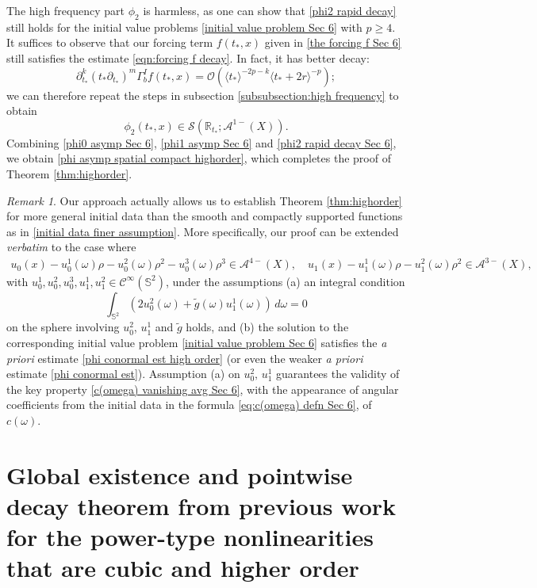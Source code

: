 \documentclass[10pt,a4paper,reqno]{amsart}
\newcommand{\CI}{\mathcal{C}^\infty}
\newcommand{\A}{\mathcal{A}}
\newcommand{\pa}{\partial}
\newcommand{\la}{\langle}
\newcommand{\ra}{\rangle}
\renewcommand{\S}{{\mathbb S}}
\theoremstyle{definition}
\theoremstyle{remark}
\newtheorem{remark}[theorem]{Remark}
\numberwithin{equation}{section}
\newcommand{\ts}{t_*}
\begin{document}
The high frequency part $\phi_2$ is harmless, as one can show that \eqref{phi2 rapid decay} still holds for the initial value problems \eqref{initial value problem Sec 6} with $p\geq 4$. It suffices to observe that our forcing term $f(\ts,x)$ given in \eqref{the forcing f Sec 6} still satisfies the estimate \eqref{eqn:forcing f decay}. In fact, it has better decay:
\[
    \pa_{t_*}^k(\ts\pa_{t_*})^m \Gamma_b^I f(\ts,x) = \mathcal{O}(\la t_*\ra^{-2p-k} \la t_*+2r\ra^{-p});
\]
we can therefore repeat the steps in subsection \ref{subsubsection:high frequency} to obtain 
\begin{equation}
\label{phi2 rapid decay Sec 6}
    \phi_2(t_*,x) \in \mathscr{S}(\mathbb{R}_{t_*};\A^{1-}(X)).
\end{equation}
Combining \eqref{phi0 asymp Sec 6}, \eqref{phi1 asymp Sec 6} and \eqref{phi2 rapid decay Sec 6}, we obtain \eqref{phi asymp spatial compact highorder}, which completes the proof of Theorem \ref{thm:highorder}.

\begin{remark}
\label{rmk:p=4 or larger}
Our approach actually allows us to establish Theorem \ref{thm:highorder} for more general initial data than the smooth and compactly supported functions as in \eqref{initial data finer assumption}. More specifically, our proof can be extended \textit{verbatim} to the case where 
\[
    \begin{gathered}
        u_0(x) - u_{0}^1(\omega)\rho - u_{0}^2(\omega)\rho^2 - u_{0}^3(\omega)\rho^3 \in \A^{4-}(X),
        \quad
        u_1(x) - u_{1}^1(\omega)\rho - u_{1}^2(\omega)\rho^2 \in \A^{3-}(X),
    \end{gathered}
\]
with $u_0^1, u_0^2, u_0^3, u_1^1, u_1^2 \in\CI(\S^2)$, under the assumptions (a) an integral condition $$   
\int_{\S^2} (2u_0^2(\omega)+\tilde{g}(\omega) u_1^1(\omega))\,d\omega = 0$$ on the sphere involving $u_{0}^2$, $u_{1}^1$ and $\tilde g$ holds, and (b) the solution to the corresponding initial value problem \eqref{initial value problem Sec 6} satisfies the \textit{a priori} estimate \eqref{phi conormal est high order} (or even the weaker \textit{a priori} estimate \eqref{phi conormal est}).
Assumption (a) on $u_0^2,\, u_1^1$ guarantees the validity of the key property \eqref{c(omega) vanishing avg Sec 6}, with the appearance of angular coefficients from the initial data in the formula \eqref{eq:c(omega) defn Sec 6}, of $c(\omega)$.
\end{remark}


\appendix
\section{Global existence and pointwise decay theorem from previous work for the power-type nonlinearities that are cubic and higher order}\label{app:GE}
\end{document}
